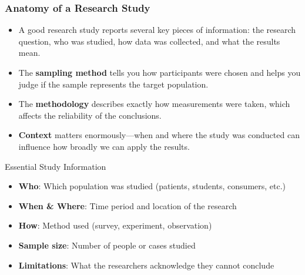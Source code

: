 \documentclass{beamer}
\begin{document}
\begin{frame}
	\frametitle{Anatomy of a Research Study}
	
	\begin{itemize}
		\item A good research study reports several key pieces of information: the research question, who was studied, how data was collected, and what the results mean.
		\item The \textbf{sampling method} tells you how participants were chosen and helps you judge if the sample represents the target population.
		\item The \textbf{methodology} describes exactly how measurements were taken, which affects the reliability of the conclusions.
		\item \textbf{Context} matters enormously—when and where the study was conducted can influence how broadly we can apply the results.
	\end{itemize}
	
	\begin{block}{Essential Study Information}
		\scriptsize
		\begin{itemize}
			\item \textbf{Who}: Which population was studied (patients, students, consumers, etc.)
			\item \textbf{When \& Where}: Time period and location of the research
			\item \textbf{How}: Method used (survey, experiment, observation)
			\item \textbf{Sample size}: Number of people or cases studied
			\item \textbf{Limitations}: What the researchers acknowledge they cannot conclude
		\end{itemize}
	\end{block}
	
\end{frame}
\end{document}
